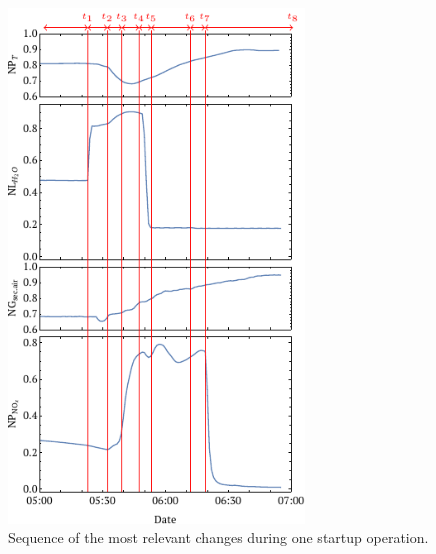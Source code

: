 \documentclass[journal=jacsat,manuscript=article]{achemso}
\begin{document}
\begin{figure}[htb]
	\centering
	\includegraphics[width=0.7\textwidth]{figure1sp.pdf}
	\caption{Sequence of the most relevant changes during one startup operation.} 	
	\label{fig:sup1all}
\end{figure}
\end{document}
